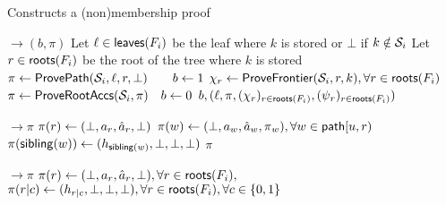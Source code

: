 \begin{algorithm}[H]%
    \caption{\small Constructs a (non)membership proof}
    \label{a:aas:provememb}
    \label{a:aas:provepath}
    \begin{algorithmic}[1]
     $\rightarrow (b,\pi)$
        \State Let $\ell\in \mathsf{leaves}(F_i)$ be the leaf where $k$ is stored or $\bot$ if $k\notin \mathcal{S}_i$
         
            \label{a:aas:provememb:paths-begin}
            \State Let $r\in \mathsf{roots}(F_i)$ be the root of the tree where $k$ is stored
            \State $\pi \gets \mathsf{ProvePath}(\mathcal{S}_i, \ell, r,\bot)\qquad b\gets 1$ %
            \label{a:aas:provememb:paths-end}
        \Else {}
            \label{a:aas:provememb:frontier-begin}
            \State $\chi_r\gets \mathsf{ProveFrontier}(\mathcal{S}_i,r,k),\forall r\in \mathsf{roots}(F_i)$
            \State $\pi\gets \mathsf{ProveRootAccs}(\mathcal{S}_i, \pi)\quad b\gets 0$
            \label{a:aas:provememb:frontier-end}
        \EndIf
        \State \Return $b, ( \ell, \pi, (\chi_r)_{r\in \mathsf{roots}(F_i)}, (\textcolor{black}{\psi}_r)_{r\in \mathsf{roots}(F_i)})$
    \EndFunction

     $\rightarrow \pi$
        \State $\pi(r) \gets ( \bot, \textcolor{black}{a}_r, \textcolor{black}{\hat{a}}_r, \bot)$
        \State $\pi(w) \gets ( \bot, \textcolor{black}{a}_w, \textcolor{black}{\hat{a}}_w, \textcolor{black}{\pi}_w), \forall w\in \mathsf{path}[u,r)$
        \For{$w\in \treepath[u,r)$ where $\sibling(w)\notin \dom(\pi)$}
            \State $\pi(\mathsf{sibling}(w)) \gets ( \textcolor{black}{h}_{\mathsf{sibling}(w)}, \bot,\bot,\bot)$
        \EndFor
        \State \Return $\pi$
    \EndFunction

     $\rightarrow \pi$
        \State $\pi(r)\gets (\bot,\textcolor{black}{a}_{r}, \textcolor{black}{\hat{a}}_{r}, \bot), \forall r\in\mathsf{roots}(F_i),$
        \State $\pi(r|c)\gets (\textcolor{black}{h}_{r|c},\bot,\bot,\bot), \forall r\in\mathsf{roots}(F_i), \forall c\in \{0,1\}$
    \EndFunction
    \end{algorithmic}
\end{algorithm}

